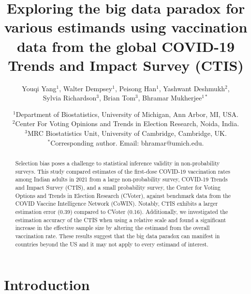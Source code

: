 \documentclass{article}
\title{Exploring the big data paradox for various estimands using vaccination data from the global COVID-19 Trends and Impact Survey (CTIS)}
\author{Youqi Yang$^1$, Walter Dempsey$^1$, Peisong Han$^1$, Yashwant Deshmukh$^2$, \\ Sylvia Richardson$^3$, Brian Tom$^3$, Bhramar Mukherjee$^{1 \ast}$}
\date{%
    $^1$Department of Biostatistics, University of Michigan, Ann Arbor, MI, USA.\\%
    $^2$Center For Voting Opinions and Trends in Election Research, Noida, India.\\%
    $^3$MRC Biostatistics Unit, University of Cambridge, Cambridge, UK.\\
    $^\ast$Corresponding author. Email: bhramar@umich.edu. \\[2ex]%
}
\begin{document}
\maketitle

\begin{abstract}
    Selection bias poses a challenge to statistical inference validity in non-probability surveys. This study compared estimates of the first-dose COVID-19 vaccination rates among Indian adults in 2021 from a large non-probability survey, COVID-19 Trends and Impact Survey (CTIS), and a small probability survey, the Center for Voting Options and Trends in Election Research (CVoter), against benchmark data from the COVID Vaccine Intelligence Network (CoWIN). Notably, CTIS exhibits a larger estimation error (0.39) compared to CVoter (0.16). Additionally, we investigated the estimation accuracy of the CTIS when using a relative scale and found a significant increase in the effective sample size by altering the estimand from the overall vaccination rate. These results suggest that the big data paradox can manifest in countries beyond the US and it may not apply to every estimand of interest.
\end{abstract}

\section{Introduction}
\end{document}
